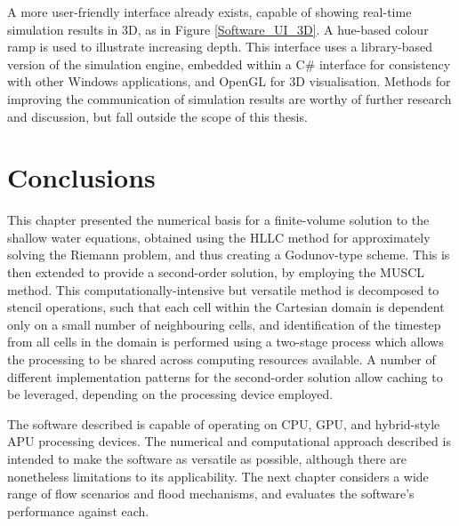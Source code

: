 A more user-friendly interface already exists, capable of showing real-time simulation results in 3D, as in Figure \ref{Software_UI_3D}. A hue-based colour ramp is used to illustrate increasing depth. This interface uses a library-based version of the simulation engine, embedded within a C\# interface for consistency with other Windows applications, and OpenGL for 3D visualisation. Methods for improving the communication of simulation results are worthy of further research and discussion, but fall outside the scope of this thesis.

\section{Conclusions}

This chapter presented the numerical basis for a finite-volume solution to the shallow water equations, obtained using the HLLC method for approximately solving the Riemann problem, and thus creating a Godunov-type scheme. This is then extended to provide a second-order solution, by employing the MUSCL method. This computationally-intensive but versatile method is decomposed to stencil operations, such that each cell within the Cartesian domain is dependent only on a small number of neighbouring cells, and identification of the timestep from all cells in the domain is performed using a two-stage process which allows the processing to be shared across computing resources available. A number of different implementation patterns for the second-order solution allow caching to be leveraged, depending on the processing device employed.

The software described is capable of operating on CPU, GPU, and hybrid-style APU processing devices. The numerical and computational approach described is intended to make the software as versatile as possible, although there are nonetheless limitations to its applicability. The next chapter considers a wide range of flow scenarios and flood mechanisms, and evaluates the software's performance against each.